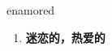 
\begin{frame}
{\huge enamored}
\begin{center}
\begin{enumerate}\Large
  \item \textbf{迷恋的，热爱的}
\end{enumerate}
\end{center}
\end{frame}
